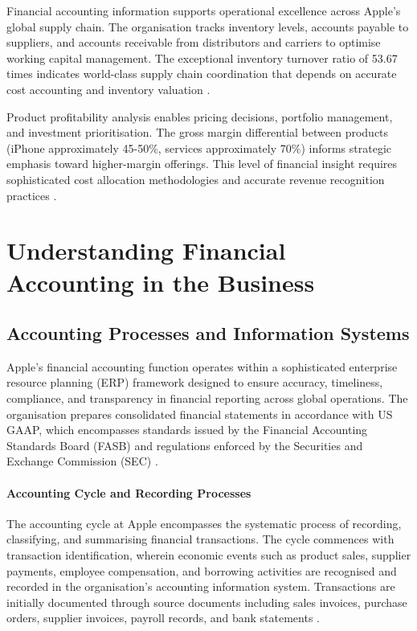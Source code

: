 \documentclass[12pt,a4paper]{article}
\begin{document}
Financial accounting information supports operational excellence across Apple's global supply chain. The organisation tracks inventory levels, accounts payable to suppliers, and accounts receivable from distributors and carriers to optimise working capital management. The exceptional inventory turnover ratio of 53.67 times indicates world-class supply chain coordination that depends on accurate cost accounting and inventory valuation \citep{apple202410k}.

Product profitability analysis enables pricing decisions, portfolio management, and investment prioritisation. The gross margin differential between products (iPhone approximately 45-50\%, services approximately 70\%) informs strategic emphasis toward higher-margin offerings. This level of financial insight requires sophisticated cost allocation methodologies and accurate revenue recognition practices \citep{kieso2023}.

\section{Understanding Financial Accounting in the Business}

\subsection{Accounting Processes and Information Systems}

Apple's financial accounting function operates within a sophisticated enterprise resource planning (ERP) framework designed to ensure accuracy, timeliness, compliance, and transparency in financial reporting across global operations. The organisation prepares consolidated financial statements in accordance with US GAAP, which encompasses standards issued by the Financial Accounting Standards Board (FASB) and regulations enforced by the Securities and Exchange Commission (SEC) \citep{fasb2024}.

\paragraph{Accounting Cycle and Recording Processes}

The accounting cycle at Apple encompasses the systematic process of recording, classifying, and summarising financial transactions. The cycle commences with transaction identification, wherein economic events such as product sales, supplier payments, employee compensation, and borrowing activities are recognised and recorded in the organisation's accounting information system. Transactions are initially documented through source documents including sales invoices, purchase orders, supplier invoices, payroll records, and bank statements \citep{kieso2023}.
\end{document}
